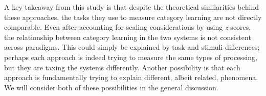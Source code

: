 \documentclass[../dissertation.tex]{subfiles}
\begin{document}
A key takeaway from this study is that despite the theoretical similarities behind these approaches, the tasks they use to measure category learning are not directly comparable. Even after accounting for scaling considerations by using \textit{z}-scores, the relationship between category learning in the two systems is not consistent across paradigms. This could simply be explained by task and stimuli differences; perhaps each approach is indeed trying to measure the same types of processing, but they are taxing the systems differently. Another possibility is that each approach is fundamentally trying to explain different, albeit related, phenomena. We will consider both of these possibilities in the general discussion. 
\end{document}
